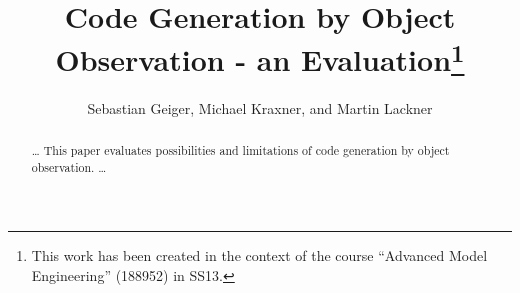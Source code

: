 \documentclass{llncs}
\begin{document}

\title{Code Generation by Object Observation - an Evaluation\footnote{This work has been created in the context of the course ``Advanced Model Engineering'' (188952) in SS13.}}



\author{Sebastian Geiger, Michael Kraxner, and Martin Lackner }






\maketitle

\begin{abstract}
 \dots
This paper evaluates possibilities and limitations of code generation by object observation. 
 \dots
\end{abstract}

\tableofcontents
\newpage
\end{document}
